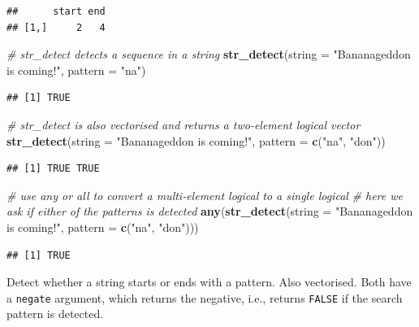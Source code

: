 \documentclass[]{book}
\newenvironment{Shaded}{}{}
\newcommand{\CommentTok}[1]{\textcolor[rgb]{0.38,0.63,0.69}{\textit{#1}}}
\newcommand{\DataTypeTok}[1]{\textcolor[rgb]{0.56,0.13,0.00}{#1}}
\newcommand{\KeywordTok}[1]{\textcolor[rgb]{0.00,0.44,0.13}{\textbf{#1}}}
\newcommand{\NormalTok}[1]{#1}
\newcommand{\StringTok}[1]{\textcolor[rgb]{0.25,0.44,0.63}{#1}}
\begin{document}
\begin{verbatim}
##      start end
## [1,]     2   4
\end{verbatim}

\begin{Shaded}
\begin{Highlighting}[]
\CommentTok{# str_detect detects a sequence in a string}
\KeywordTok{str_detect}\NormalTok{(}\DataTypeTok{string =} \StringTok{"Bananageddon is coming!"}\NormalTok{, }
           \DataTypeTok{pattern =} \StringTok{"na"}\NormalTok{)}
\end{Highlighting}
\end{Shaded}

\begin{verbatim}
## [1] TRUE
\end{verbatim}

\begin{Shaded}
\begin{Highlighting}[]
\CommentTok{# str_detect is also vectorised and returns a two-element logical vector}
\KeywordTok{str_detect}\NormalTok{(}\DataTypeTok{string =} \StringTok{"Bananageddon is coming!"}\NormalTok{, }
           \DataTypeTok{pattern =} \KeywordTok{c}\NormalTok{(}\StringTok{"na"}\NormalTok{, }\StringTok{"don"}\NormalTok{))}
\end{Highlighting}
\end{Shaded}

\begin{verbatim}
## [1] TRUE TRUE
\end{verbatim}

\begin{Shaded}
\begin{Highlighting}[]
\CommentTok{# use any or all to convert a multi-element logical to a single logical}
\CommentTok{# here we ask if either of the patterns is detected}
\KeywordTok{any}\NormalTok{(}\KeywordTok{str_detect}\NormalTok{(}\DataTypeTok{string =} \StringTok{"Bananageddon is coming!"}\NormalTok{, }
               \DataTypeTok{pattern =} \KeywordTok{c}\NormalTok{(}\StringTok{"na"}\NormalTok{, }\StringTok{"don"}\NormalTok{)))}
\end{Highlighting}
\end{Shaded}

\begin{verbatim}
## [1] TRUE
\end{verbatim}

Detect whether a string starts or ends with a pattern. Also vectorised.
Both have a \texttt{negate} argument, which returns the negative, i.e., returns \texttt{FALSE} if the search pattern is detected.
\end{document}
